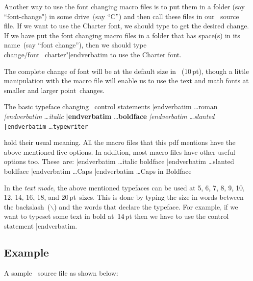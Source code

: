 {{Another way to use the font changing macro files is to put them in a folder (say ``font-change") in some drive~(say ``C'') and then call these files in our \capstex\ source file. If we want to use the Charter font, we should type {\color{brown}\verbatim } to get the desired change. If we have put the font changing macro files in a folder that has space(s) in its name~(say ``font change''), then we should type {\color{brown}\verbatim  change/font_charter"|endverbatim} to use the Charter font.

The complete change of font will be at the default size in \capstex\ (10\,pt), though a little manipulation with the macro file will enable us to use the text and math fonts at smaller and larger point~changes.

\goodbreak The basic typeface changing \capstex\ control statements\sk
{\obeylines{}
{\color{brown}\verbatim\rm|endverbatim} \dots  {\rm roman}
{\color{brown}\verbatim\it|endverbatim} \dots  {\it italic}
{\color{brown}\verbatim\bf|endverbatim} \dots  {\bf boldface}
{\color{brown}\verbatim\sl|endverbatim} \dots  {\sl slanted}
{\color{brown}\verbatim\tt|endverbatim} \dots  {\tt typewriter}
}\sk

\ii hold their usual meaning. All the macro files that this {\caps pdf} mentions have the above mentioned five options. In addition, most macro files have other useful options too. These~are:\sk
{\obeylines{}
{\color{brown}\verbatim\itbf|endverbatim} \dots  {\itbf italic boldface}
{\color{brown}\verbatim\slbf|endverbatim} \dots  {\slbf slanted boldface}
{\color{brown}\verbatim\caps|endverbatim} \dots  {\caps Caps}
{\color{brown}\verbatim\capsbf|endverbatim} \dots  {\capsbf Caps in Boldface}
}\ms

In the {\sl text mode}, the above mentioned typefaces can be used at 5, 6, 7, 8, 9, 10, 12, 14, 16, 18, and 20\,pt~sizes. This is done by typing the size in words between the backslash~($\backslash$) and the words that declare the typeface. For example, if we want to typeset some text in bold at~14\,pt then we have to use the control statement {\color{brown}\verbatim \fourteenbf|endverbatim}.





\newpage\subsection{Example}A sample \capstex\ source file as shown below:

}}
